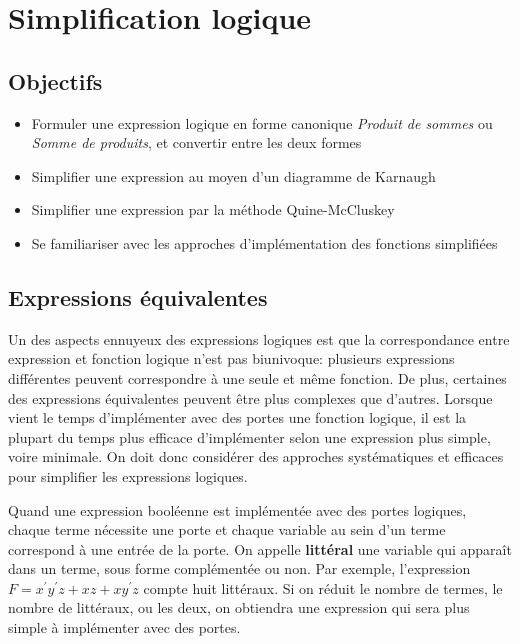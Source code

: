 \documentclass[letter, oneside]{book}
\begin{document}
\chapter{Simplification logique}
\label{sec:org508522b}


\section{Objectifs}
\label{sec:org428e8f6}
\begin{itemize}
\item Formuler une expression logique en forme canonique \emph{Produit
de sommes} ou \emph{Somme de produits}, et convertir entre les deux formes
\item Simplifier une expression au moyen d'un diagramme de
Karnaugh
\item Simplifier une expression par la méthode Quine-McCluskey
\item Se familiariser avec les approches d'implémentation des fonctions
simplifiées
\end{itemize}


\section{Expressions équivalentes}
\label{sec:org5aee96e}

Un des aspects ennuyeux des expressions logiques est que la
correspondance entre expression et fonction logique n'est pas
biunivoque: plusieurs expressions différentes peuvent correspondre à
une seule et même fonction. De plus, certaines des expressions
équivalentes peuvent être plus complexes que d'autres. Lorsque vient
le temps d'implémenter avec des portes une fonction logique, il est la
plupart du temps plus efficace d'implémenter selon une expression plus
simple, voire minimale. On doit donc considérer des approches
systématiques et efficaces pour simplifier les expressions logiques.

Quand une expression booléenne est implémentée avec des portes
logiques, chaque terme nécessite une porte et chaque variable au sein
d'un terme correspond à une entrée de la porte. On appelle \textbf{littéral}
une variable qui apparaît dans un terme, sous forme complémentée ou
non. Par exemple, l'expression \(F = x^\prime y^\prime z + xz +
xy^\prime z\) compte huit littéraux. Si on réduit le nombre de
termes, le nombre de littéraux, ou les deux, on obtiendra une
expression qui sera plus simple à implémenter avec des portes.
\end{document}
